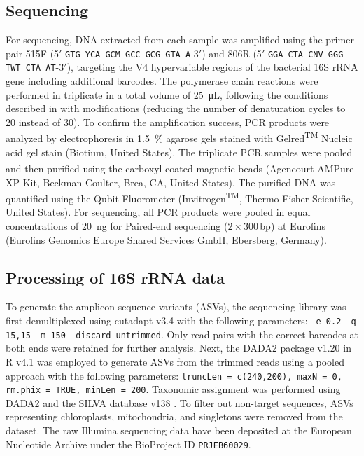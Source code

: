 \subsection{Sequencing}

For sequencing, DNA extracted from each sample was amplified using the primer pair 515F (5\('\)-\texttt{GTG YCA GCM GCC GCG GTA A}-3\('\)) and 806R (5\('\)-\texttt{GGA CTA CNV GGG TWT CTA AT}-3\('\)), targeting the V4 hypervariable regions of the bacterial 16S rRNA gene \citep{Apprill2015, Parada2016} including additional barcodes. The polymerase chain reactions were performed in triplicate in a total volume of \SI{25}{\micro\liter}, following the conditions described in \citet{Rodriguez2022} with modifications (reducing the number of denaturation cycles to 20 instead of 30). To confirm the amplification success, PCR products were analyzed by electrophoresis in \SI{1.5}{\percent} agarose gels stained with Gelred\textsuperscript{TM} Nucleic acid gel stain (Biotium, United States). The triplicate PCR samples were pooled and then purified using the carboxyl-coated magnetic beads (Agencourt\textsuperscript{\textregistered} AMPure\textsuperscript{\textregistered} XP Kit, Beckman Coulter, Brea, CA, United States). The purified DNA was quantified using the Qubit Fluorometer (Invitrogen\textsuperscript{TM}, Thermo Fisher Scientific, United States). For sequencing, all PCR products were pooled in equal concentrations of \SI{20}{\nano\gram} for Paired-end sequencing ($2\times 300$\,bp) at Eurofins (Eurofins Genomics Europe Shared Services GmbH, Ebersberg, Germany).

\subsection{Processing of 16S rRNA data}

To generate the amplicon sequence variants (ASVs), the sequencing library was first demultiplexed using cutadapt v3.4 \citep{Martin2011} with the following parameters: \texttt{-e 0.2 -q 15,15 -m 150 --discard-untrimmed}. Only read pairs with the correct barcodes at both ends were retained for further analysis. Next, the DADA2 package v1.20 \citep{Callahan2016} in R v4.1 was employed to generate ASVs from the trimmed reads using a pooled approach with the following parameters: \texttt{truncLen = c(240,200), maxN = 0, rm.phix = TRUE, minLen = 200}. Taxonomic assignment was performed using DADA2 and the SILVA database v138 \citep{Quast2012}. To filter out non-target sequences, ASVs representing chloroplasts, mitochondria, and singletons were removed from the dataset. The raw Illumina sequencing data have been deposited at the European Nucleotide Archive under the BioProject ID \texttt{PRJEB60029}.

